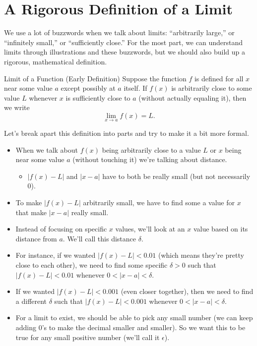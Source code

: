 \section{A Rigorous Definition of a Limit}

We use a lot of buzzwords when we talk about limits: ``arbitrarily large,'' or ``infinitely small,'' or ``sufficiently close.'' For the most part, we can understand limits through illustrations and these buzzwords, but we should also build up a rigorous, mathematical definition.

\begin{defn}{Limit of a Function (Early Definition)}
Suppose the function $f$ is defined for all $x$ near some value $a$ except possibly at $a$ itself. If $f(x)$ is arbitrarily close to some value $L$ whenever $x$ is sufficiently close to $a$ (without actually equaling it), then we write
\[\lim_{x\to a} f(x) = L.\]
\end{defn}

Let's break apart this definition into parts and try to make it a bit more formal.\\

\begin{itemize}
  \item When we talk about $f(x)$ being arbitrarily close to a value $L$ or $x$ being near some value $a$ (without touching it) we're talking about distance.
  \begin{itemize}
    \item $|f(x)-L|$ and $|x-a|$ have to both be really small (but not necessarily 0).
  \end{itemize}
  \item To make $|f(x)-L|$ arbitrarily small, we have to find some a value for $x$ that make $|x-a|$ really small.
  \item Instead of focusing on specific $x$ values, we'll look at an $x$ value based on its distance from $a$. We'll call this distance $\delta$.
  \item For instance, if we wanted $|f(x)-L|<0.01$ (which means they're pretty close to each other), we need to find some specific $\delta>0$ such that $|f(x)-L|<0.01$ whenever $0<|x-a|<\delta$.
  \item If we wanted $|f(x)-L|<0.001$ (even closer together), then we need to find a different $\delta$ such that $|f(x)-L|<0.001$ whenever $0<|x-a|<\delta$.
  \item For a limit to exist, we should be able to pick any small number (we can keep adding 0's to make the decimal smaller and smaller). So we want this to be true for any small positive number (we'll call it $\epsilon$).
\end{itemize}

